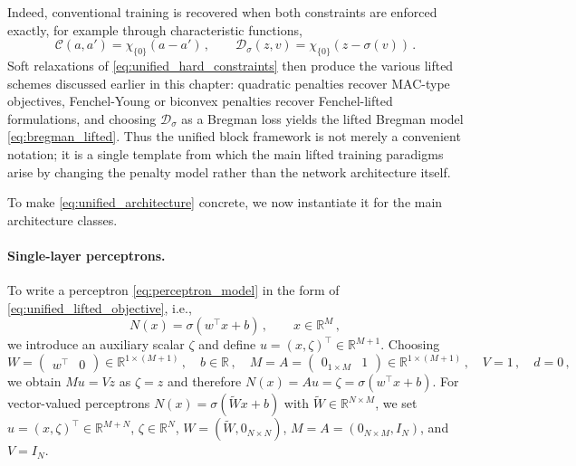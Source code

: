 Indeed, conventional training is recovered when both constraints are enforced exactly, for example through characteristic functions,
\begin{equation}\label{eq:unified_hard_constraints}
    \mathcal{C}(a,a') = \chi_{\{0\}}(a-a') \, , \qquad \mathcal{D}_{\sigma}(z,v) = \chi_{\{0\}}\!\left(z-\sigma(v)\right) \, .
\end{equation}
Soft relaxations of \eqref{eq:unified_hard_constraints} then produce the various lifted schemes discussed earlier in this chapter: quadratic penalties recover MAC-type objectives, Fenchel-Young or biconvex penalties recover Fenchel-lifted formulations, and choosing $\mathcal{D}_{\sigma}$ as a Bregman loss yields the lifted Bregman model \eqref{eq:bregman_lifted}. Thus the unified block framework is not merely a convenient notation; it is a single template from which the main lifted training paradigms arise by changing the penalty model rather than the network architecture itself.

To make \eqref{eq:unified_architecture} concrete, we now instantiate it for the main architecture classes.

\paragraph{Single-layer perceptrons.}
To write a perceptron \eqref{eq:perceptron_model} in the form of \eqref{eq:unified_lifted_objective}, i.e.,
\begin{equation*}
    N(x) = \sigma(w^\top x + b) \, , \qquad x \in \mathbb{R}^{M} \, ,
\end{equation*}
we introduce an auxiliary scalar $\zeta$ and define $u=(x,\zeta)^\top \in \mathbb{R}^{M+1}$. Choosing
\begin{equation*}
    W = \begin{pmatrix} w^\top & 0 \end{pmatrix} \in \mathbb{R}^{1\times(M+1)} \, , \quad
    b\in\mathbb{R} \, , \quad
    M=A=\begin{pmatrix}0_{1\times M} & 1\end{pmatrix} \in \mathbb{R}^{1\times(M+1)} \, , \quad
    V=1 \, , \quad d=0 \, ,
\end{equation*}
we obtain $Mu=Vz$ as $\zeta=z$ and therefore $N(x)=Au=\zeta=\sigma(w^\top x+b)$. For vector-valued perceptrons $N(x)=\sigma(\widetilde W x+b)$ with $\widetilde W\in\mathbb{R}^{N\times M}$, we set $u=(x,\zeta)^\top\in\mathbb{R}^{M+N}$, $\zeta\in\mathbb{R}^{N}$, $W=(\widetilde W,0_{N\times N})$, $M=A=(0_{N\times M},I_N)$, and $V=I_N$.

